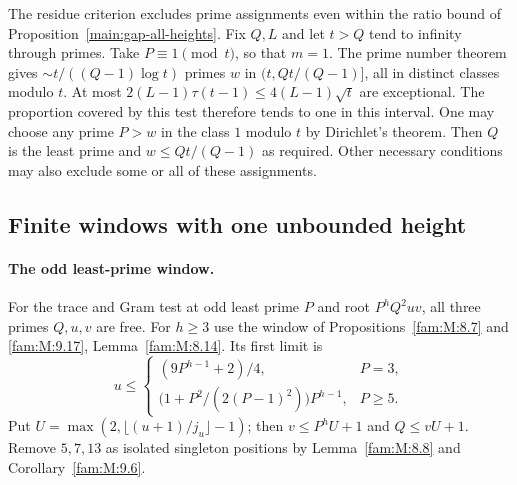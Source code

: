 \documentclass[11pt,a4paper]{article}
\numberwithin{equation}{section}
\theoremstyle{remark}
\begin{document}
The residue criterion excludes prime assignments even within the ratio bound of Proposition~\ref{main:gap-all-heights}. Fix $Q,L$
and let $t>Q$ tend to infinity through primes. Take $P\equiv1\pmod t$,
so that $m=1$. The prime number theorem gives
$\sim t/((Q-1)\log t)$ primes $w$ in $(t,Qt/(Q-1)]$, all in
distinct classes modulo $t$. At most $2(L-1)\tau(t-1)\le
4(L-1)\sqrt t$ are exceptional. The proportion covered by this
test therefore tends to one in this interval. One may choose any
prime $P>w$ in the class $1$ modulo $t$ by Dirichlet's theorem. Then $Q$ is the least prime and $w\le Qt/(Q-1)$ as required. Other necessary conditions may also exclude some or all of these assignments.
\subsection{Finite windows with one unbounded height}\label{sec:finite-four-windows}
\paragraph{The odd least-prime window.}
For the trace and Gram test at odd least prime $P$ and
root $P^hQ^2uv$, all three primes $Q,u,v$ are free. For $h\ge3$
use the window of Propositions~\ref{fam:M:8.7} and \ref{fam:M:9.17}, Lemma~\ref{fam:M:8.14}.
Its first limit is
\[
 u\le\begin{cases}
   (9P^{h-1}+2)/4,&P=3,\\
   \bigl(1+P^2/(2(P-1)^2)\bigr)P^{h-1},&P\ge5.
 \end{cases}
\]
Put $U=\max(2,\lfloor(u+1)/j_u\rfloor-1)$; then $v\le P^hU+1$ and $Q\le vU+1$. Remove $5,7,13$ as
isolated singleton positions by Lemma~\ref{fam:M:8.8} and Corollary~\ref{fam:M:9.6}.
\end{document}
